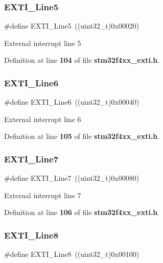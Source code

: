 \subsubsection{E\+X\+T\+I\+\_\+\+Line5}
{\footnotesize\ttfamily \#define E\+X\+T\+I\+\_\+\+Line5~((uint32\+\_\+t)0x00020)}

External interrupt line 5 

Definition at line \textbf{ 104} of file \textbf{ stm32f4xx\+\_\+exti.\+h}.

\mbox{\label{group__EXTI__Lines_ga97a5145d1d2612dd53bdd9db3d366873}} 
\subsubsection{E\+X\+T\+I\+\_\+\+Line6}
{\footnotesize\ttfamily \#define E\+X\+T\+I\+\_\+\+Line6~((uint32\+\_\+t)0x00040)}

External interrupt line 6 

Definition at line \textbf{ 105} of file \textbf{ stm32f4xx\+\_\+exti.\+h}.

\mbox{\label{group__EXTI__Lines_ga3b7155d54a4a98394b599718901ccbe5}} 
\subsubsection{E\+X\+T\+I\+\_\+\+Line7}
{\footnotesize\ttfamily \#define E\+X\+T\+I\+\_\+\+Line7~((uint32\+\_\+t)0x00080)}

External interrupt line 7 

Definition at line \textbf{ 106} of file \textbf{ stm32f4xx\+\_\+exti.\+h}.

\mbox{\label{group__EXTI__Lines_gacd51e087a088c3315049394cddf79e88}} 
\subsubsection{E\+X\+T\+I\+\_\+\+Line8}
{\footnotesize\ttfamily \#define E\+X\+T\+I\+\_\+\+Line8~((uint32\+\_\+t)0x00100)}


